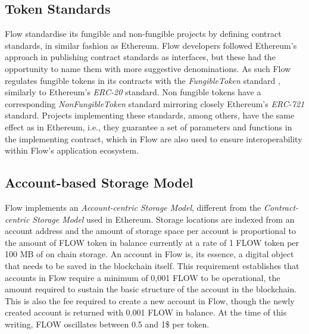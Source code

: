\documentclass[../NFTComp_IEEE.tex]{subfiles}
\begin{document}
\subsection{Token Standards}
Flow standardise its fungible and non-fungible projects by defining contract standards, in similar fashion as Ethereum. Flow developers followed Ethereum's approach in publishing contract standards as interfaces, but these had the opportunity to name them with more suggestive denominations. As such Flow regulates fungible tokens in its contracts with the \textit{FungibleToken} standard \cite{Dapper2022c}, similarly to Ethereum's \textit{ERC-20} standard. Non fungible tokens have a corresponding \textit{NonFungibleToken} standard \cite{Dapper2022d} mirroring closely Ethereum's \textit{ERC-721} standard. Projects implementing these standards, among others, have the same effect as in Ethereum, i.e., they guarantee a set of parameters and functions in the implementing contract, which in Flow are also used to ensure interoperability within Flow's application ecosystem.

\subsection{Account-based Storage Model}
Flow implements an \textit{Account-centric Storage Model}, different from the \textit{Contract-centric Storage Model} used in Ethereum. Storage locations are indexed from an account address and the amount of storage space per account is proportional to the amount of FLOW token in balance currently at a rate of 1 FLOW token per 100 MB of on chain storage. An account in Flow is, its essence, a digital object that needs to be saved in the blockchain itself. This requirement establishes that accounts in Flow require a minimum of 0,001 FLOW to be operational, the amount required to sustain the basic structure of the account in the blockchain. This is also the fee required to create a new account in Flow, though the newly created account is returned with 0.001 FLOW in balance. At the time of this writing, FLOW oscillates between 0.5 and 1\$ per token.
\end{document}
